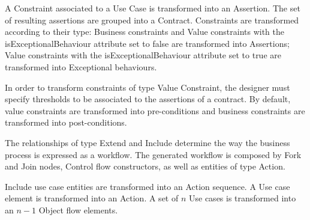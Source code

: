 
A {\sf Constraint} associated to a {\sf Use Case}  is transformed into an  {\sf Assertion}.  
The set of resulting assertions  are grouped into a {\sf Contract}.
Constraints are transformed according to their type:
{\sc Business} constraints and {\sc Value} constraints with the {\sf  isExceptionalBehaviour} attribute set to false are transformed into {\sf Assertion}s;
{\sc Value } constraints with the {\sf  isExceptionalBehaviour} attribute set to true are transformed into {\sf Exceptional behaviour}s.

In order to transform constraints of type {\sf Value Constraint}, the designer must specify thresholds to be associated to the assertions of a contract.
By default, value constraints are transformed into pre-conditions and business constraints are transformed into post-conditions. 
  
%
%


The relationships of type  {\sc Extend} and {\sc Include}  determine the way the business process is expressed as a workflow.  
The generated workflow is composed by {\sf Fork} and {\sf Join} nodes,  {\sc Control flow} constructors, as well as entities of type {\sc Action}.


{\sf Include} use case entities are transformed into an {\sf Action} sequence.
A {\sc Use case} element is transformed into an {\sf Action}. 
A set of $n$ {\sc Use cases} is transformed into an  $n-1$ {\sf Object flow} elements. 

